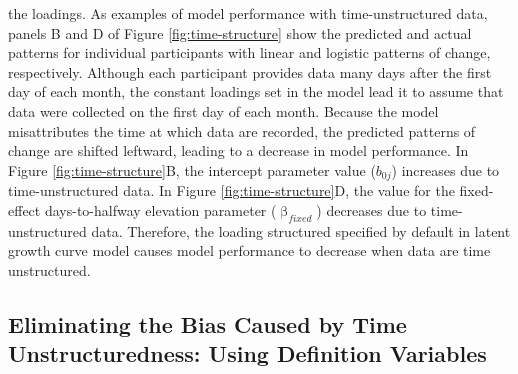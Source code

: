 \documentclass[
12pt, %
twoside,
english]{guelphthesis}
\begin{document}
\noindent the loadings. As examples of model performance with time-unstructured data, panels B and D of Figure \ref{fig:time-structure} show the predicted and actual patterns for individual participants with linear and logistic patterns of change, respectively. Although each participant provides data many days after the first day of each month, the constant loadings set in the model lead it to assume that data were collected on the first day of each month. Because the model misattributes the time at which data are recorded, the predicted patterns of change are shifted leftward, leading to a decrease in model performance. In Figure \ref{fig:time-structure}B, the intercept parameter value (\(b_{0j}\)) increases due to time-unstructured data. In Figure \ref{fig:time-structure}D, the value for the fixed-effect days-to-halfway elevation parameter (\(\upbeta_{fixed}\)) decreases due to time-unstructured data. Therefore, the loading structured specified by default in latent growth curve model causes model performance to decrease when data are time unstructured.

\hypertarget{def-variables}{%
\subsection{Eliminating the Bias Caused by Time Unstructuredness: Using Definition Variables}\label{def-variables}}
\end{document}
